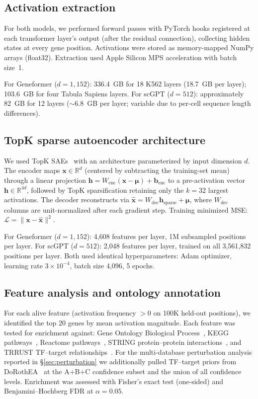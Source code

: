 \documentclass[onecolumn]{article}
\begin{document}
\subsection{Activation extraction}

For both models, we performed forward passes with PyTorch hooks registered at each transformer layer's output (after the residual connection), collecting hidden states at every gene position. Activations were stored as memory-mapped NumPy arrays (float32). Extraction used Apple Silicon MPS acceleration with batch size~1.

For Geneformer ($d{=}1{,}152$): 336.4~GB for 18 K562 layers (18.7~GB per layer); 103.6~GB for four Tabula Sapiens layers. For scGPT ($d{=}512$): approximately 82~GB for 12 layers ($\sim$6.8~GB per layer; variable due to per-cell sequence length differences).

\subsection{TopK sparse autoencoder architecture}

We used TopK SAEs~\cite{makhzani2013ksparse} with an architecture parameterized by input dimension $d$. The encoder maps $\mathbf{x} \in \mathbb{R}^{d}$ (centered by subtracting the training-set mean) through a linear projection $\mathbf{h} = W_\text{enc}(\mathbf{x} - \boldsymbol{\mu}) + \mathbf{b}_\text{enc}$ to a pre-activation vector $\mathbf{h} \in \mathbb{R}^{4d}$, followed by TopK sparsification retaining only the $k{=}32$ largest activations. The decoder reconstructs via $\hat{\mathbf{x}} = W_\text{dec}\mathbf{h}_\text{sparse} + \boldsymbol{\mu}$, where $W_\text{dec}$ columns are unit-normalized after each gradient step. Training minimized MSE: $\mathcal{L} = \|\mathbf{x} - \hat{\mathbf{x}}\|^2$.

For Geneformer ($d{=}1{,}152$): 4,608 features per layer, 1M subsampled positions per layer. For scGPT ($d{=}512$): 2,048 features per layer, trained on all 3,561,832 positions per layer. Both used identical hyperparameters: Adam optimizer, learning rate $3 \times 10^{-4}$, batch size 4,096, 5 epochs.

\subsection{Feature analysis and ontology annotation}

For each alive feature (activation frequency $> 0$ on 100K held-out positions), we identified the top 20 genes by mean activation magnitude. Each feature was tested for enrichment against: Gene Ontology Biological Process~\cite{ashburner2000go}, KEGG pathways~\cite{kanehisa2000kegg}, Reactome pathways~\cite{jassal2020reactome}, STRING protein--protein interactions~\cite{szklarczyk2023string}, and TRRUST TF--target relationships~\cite{han2018trrust}. For the multi-database perturbation analysis reported in \S\ref{sec:perturbation} we additionally pulled TF--target priors from DoRothEA~\cite{garcia-alonso2019dorothea} at the A+B+C confidence subset and the union of all confidence levels. Enrichment was assessed with Fisher's exact test (one-sided) and Benjamini--Hochberg FDR at $\alpha = 0.05$.
\end{document}

